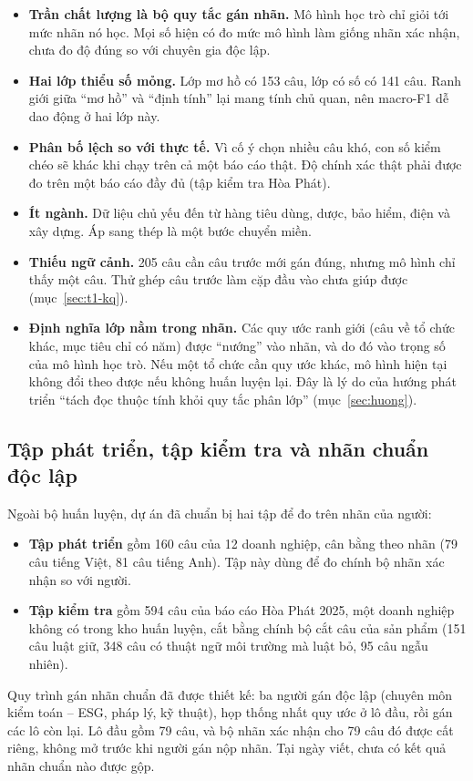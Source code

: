 \begin{itemize}
\item \textbf{Trần chất lượng là bộ quy tắc gán nhãn.} Mô hình học trò chỉ giỏi tới mức nhãn nó học. Mọi số hiện có đo mức mô hình làm giống nhãn xác nhận, chưa đo độ đúng so với chuyên gia độc lập.
\item \textbf{Hai lớp thiểu số mỏng.} Lớp mơ hồ có 153 câu, lớp có số có 141 câu. Ranh giới giữa “mơ hồ” và “định tính” lại mang tính chủ quan, nên macro-F1 dễ dao động ở hai lớp này.
\item \textbf{Phân bố lệch so với thực tế.} Vì cố ý chọn nhiều câu khó, con số kiểm chéo sẽ khác khi chạy trên cả một báo cáo thật. Độ chính xác thật phải được đo trên một báo cáo đầy đủ (tập kiểm tra Hòa Phát).
\item \textbf{Ít ngành.} Dữ liệu chủ yếu đến từ hàng tiêu dùng, dược, bảo hiểm, điện và xây dựng. Áp sang thép là một bước chuyển miền.
\item \textbf{Thiếu ngữ cảnh.} 205 câu cần câu trước mới gán đúng, nhưng mô hình chỉ thấy một câu. Thử ghép câu trước làm cặp đầu vào chưa giúp được (mục~\ref{sec:t1-kq}).
\item \textbf{Định nghĩa lớp nằm trong nhãn.} Các quy ước ranh giới (câu về tổ chức khác, mục tiêu chỉ có năm) được “nướng” vào nhãn, và do đó vào trọng số của mô hình học trò. Nếu một tổ chức cần quy ước khác, mô hình hiện tại không đổi theo được nếu không huấn luyện lại. Đây là lý do của hướng phát triển “tách đọc thuộc tính khỏi quy tắc phân lớp” (mục~\ref{sec:huong}).
\end{itemize}

\subsection{Tập phát triển, tập kiểm tra và nhãn chuẩn độc lập}\label{sec:t1-dev-test}

Ngoài bộ huấn luyện, dự án đã chuẩn bị hai tập để đo trên nhãn của người:
\begin{itemize}
\item \textbf{Tập phát triển} gồm 160 câu của 12 doanh nghiệp, cân bằng theo nhãn (79 câu tiếng Việt, 81 câu tiếng Anh). Tập này dùng để đo chính bộ nhãn xác nhận so với người.
\item \textbf{Tập kiểm tra} gồm 594 câu của báo cáo Hòa Phát 2025, một doanh nghiệp không có trong kho huấn luyện, cắt bằng chính bộ cắt câu của sản phẩm (151 câu luật giữ, 348 câu có thuật ngữ môi trường mà luật bỏ, 95 câu ngẫu nhiên).
\end{itemize}
Quy trình gán nhãn chuẩn đã được thiết kế: ba người gán độc lập (chuyên môn kiểm toán – ESG, pháp lý, kỹ thuật), họp thống nhất quy ước ở lô đầu, rồi gán các lô còn lại. Lô đầu gồm 79 câu, và bộ nhãn xác nhận cho 79 câu đó được cất riêng, không mở trước khi người gán nộp nhãn. Tại ngày viết, chưa có kết quả nhãn chuẩn nào được gộp.

